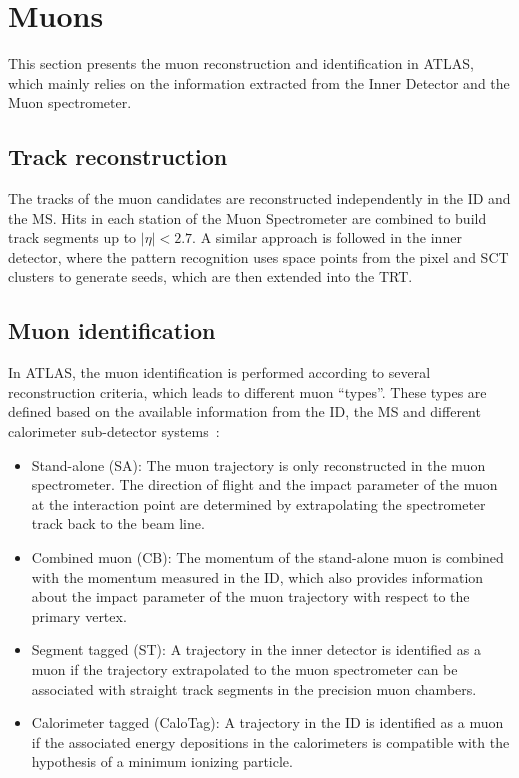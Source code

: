 \section{Muons}
    \label{sec:MuonReco}

This section presents the muon reconstruction and identification in ATLAS, which mainly relies on the information extracted from the Inner Detector and the Muon spectrometer. 


\subsection{Track reconstruction}
    \label{subsec:MuonTrackReconstruction}

The tracks of the muon candidates are reconstructed independently in the ID and the MS.
Hits in each station of the Muon Spectrometer are combined to build track segments up to $|\eta|<2.7$.
A similar approach is followed in the inner detector, where the pattern recognition uses space points from the pixel and SCT clusters to generate seeds, which are then extended into the TRT.

\subsection{Muon identification}
    \label{subsec:MuonIdentification}

In ATLAS, the muon identification is performed according to several reconstruction criteria, which leads to different muon ``types''.
These types are defined based on the available information from the ID, the MS and different calorimeter sub-detector systems~\cite{Aad:2014rra}:

\begin{itemize}
\item{Stand-alone (SA):} The muon trajectory is only reconstructed in the muon spectrometer. The direction of flight and the impact parameter of the muon at the interaction point are determined by extrapolating the spectrometer track back to the beam line.
\item{Combined muon (CB):} The momentum of the stand-alone muon is combined with the momentum measured in the ID, which also provides information about the impact parameter of the muon trajectory with respect to the primary vertex.
\item{Segment tagged (ST):} A trajectory in the inner detector is identified as a muon if the trajectory extrapolated to the muon spectrometer can be associated with straight track segments in the precision muon chambers.
\item{Calorimeter tagged (CaloTag):} A trajectory in the ID is identified as a muon if the associated energy depositions in the calorimeters is compatible with the hypothesis of a minimum ionizing particle.
\end{itemize}

